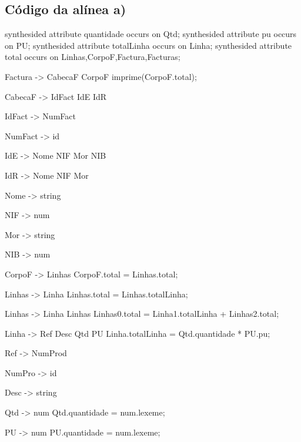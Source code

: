 \documentclass[11pt,a4paper]{article}
\begin{document}
\subsection{Código da alínea a)}
\begin{code_txt}
synthesided attribute quantidade occurs on Qtd;
synthesided attribute pu occurs on PU;
synthesided attribute totalLinha occurs on Linha;
synthesided attribute total occurs on Linhas,CorpoF,Factura,Facturas;


Factura -> CabecaF CorpoF {imprime(CorpoF.total);}

CabecaF -> IdFact IdE IdR

IdFact -> NumFact

NumFact -> id

IdE -> Nome NIF Mor NIB

IdR -> Nome NIF Mor

Nome -> string

NIF -> num

Mor -> string

NIB -> num

CorpoF -> Linhas {CorpoF.total = Linhas.total;}

Linhas -> Linha {Linhas.total = Linhas.totalLinha;}

Linhas -> Linha Linhas {Linhas0.total = Linha1.totalLinha + Linhas2.total;}

Linha -> Ref Desc Qtd PU {Linha.totalLinha = Qtd.quantidade * PU.pu;}

Ref -> NumProd

NumPro -> id

Desc -> string

Qtd -> num { Qtd.quantidade = num.lexeme;}

PU -> num { PU.quantidade = num.lexeme;}




\end{code_txt}
\newpage
\end{document}
